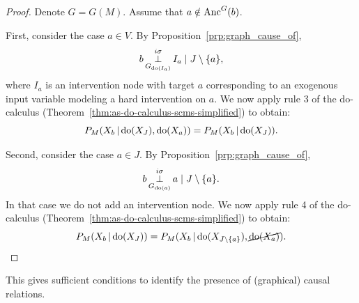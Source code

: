 \begin{proof}
  Denote $G = G(M)$. Assume that $a \notin \mathrm{Anc}^G(b)$.

  First, consider the case $a \in V$.
  By Proposition~\ref{prp:graph_cause_of},
  $$b \operatorname*{\perp}^{i\sigma}_{G_{\operatorname{do}(I_a)}} I_a \mid J \setminus \{a\},$$
  where $I_a$ is an intervention node with target $a$ corresponding to an exogenous input variable modeling a hard intervention on $a$.
  We now apply rule 3 of the do-calculus (Theorem~\ref{thm:as-do-calculus-scms-simplified}) to obtain:
    $$P_{M}(X_b \operatorname*{|} \operatorname{do}(X_J), \operatorname{do}(X_a)) = P_{M}(X_b \operatorname*{|} \operatorname{do}(X_J)).$$

  Second, consider the case $a \in J$. 
  By Proposition~\ref{prp:graph_cause_of},
    $$b \operatorname*{\perp}^{i\sigma}_{G_{\operatorname{do}(a)}} a \mid J \setminus \{a\}.$$
  In that case we do not add an intervention node. 
  We now apply rule 4 of the do-calculus (Theorem~\ref{thm:as-do-calculus-scms-simplified}) to obtain:
    $$P_{M}(X_b \operatorname*{|} \operatorname{do}(X_J)) = P_{M}(X_b \operatorname*{|} \operatorname{do}(X_{J\setminus \{a\}}),\cancel{\operatorname{do}(X_a)}).$$


\end{proof}
This gives sufficient conditions to identify the presence of (graphical) causal relations.
%

